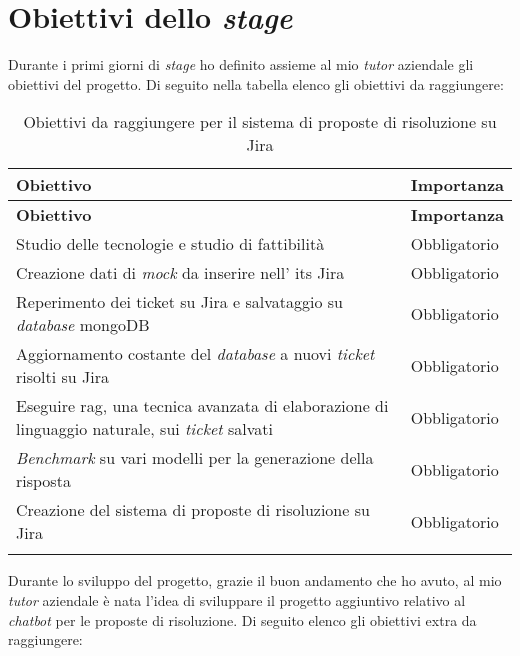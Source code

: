 \section{Obiettivi dello \textit{stage}} \label{sec:obiettiviStage}
Durante i primi giorni di \textit{stage} ho definito assieme al mio \textit{tutor} aziendale gli obiettivi del progetto.
Di seguito nella tabella elenco gli obiettivi da raggiungere:
\renewcommand{\arraystretch}{2}
\begin{longtable}{|p{10cm}|p{2cm}|}
    \hline
    \rowcolor{tableheader}\textbf{Obiettivo} & \textbf{Importanza} \\
    \hline
    \endfirsthead

    \rowcolor{tableheader}\textbf{Obiettivo} & \textbf{Importanza} \\
    \hline
    \endhead

    \hline
    \endfoot

    \hline
    \endlastfoot
    \rowcolor{tableoddrow} Studio delle tecnologie e studio di fattibilità & Obbligatorio \\
    \hline
    \rowcolor{tableevenrow} Creazione dati di \textit{mock} da inserire nell' \gls{its} Jira & Obbligatorio \\
    \hline
    \rowcolor{tableoddrow} Reperimento dei ticket su Jira e salvataggio su \textit{database} mongoDB & Obbligatorio \\
    \hline
    \rowcolor{tableevenrow} Aggiornamento costante del \textit{database} a nuovi \textit{ticket} risolti su Jira & Obbligatorio \\
    \hline
    \rowcolor{tableoddrow} Eseguire \gls{rag}, una tecnica avanzata di elaborazione di linguaggio naturale, sui \textit{ticket} salvati & Obbligatorio \\
    \hline
    \rowcolor{tableevenrow} \textit{Benchmark} su vari modelli per la generazione della risposta & Obbligatorio \\
    \hline
    \rowcolor{tableoddrow} Creazione del sistema di proposte di risoluzione su Jira & Obbligatorio \\
    \hline
    \caption{Obiettivi da raggiungere per il sistema di proposte di risoluzione su Jira}
    \label{tab:obiettiviJira}
\end{longtable}
\noindent
Durante lo sviluppo del progetto, grazie il buon andamento che ho avuto, al mio \textit{tutor} aziendale è nata l'idea di sviluppare il progetto aggiuntivo relativo al \textit{chatbot} per le proposte di risoluzione.
Di seguito elenco gli obiettivi extra da raggiungere:
